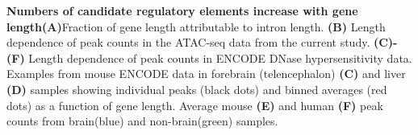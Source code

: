 \textbf{Numbers of candidate regulatory elements increase with gene length}\textbf{(A)}Fraction of gene length attributable to intron
length. \textbf{(B)} Length dependence of peak counts in the ATAC-seq data from the current study. \textbf{(C)-(F)} Length dependence of peak counts in ENCODE DNase hypersensitivity data. Examples from mouse ENCODE data in forebrain (telencephalon) \textbf{(C)} and liver \textbf{(D)} samples showing individual peaks (black dots) and binned averages (red dots) as a function of gene length. Average mouse \textbf{(E)} and human \textbf{(F)} peak counts from brain(blue) and non-brain(green) samples.

